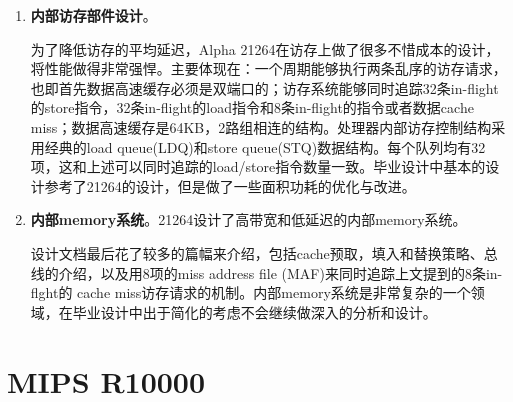 \begin{enumerate}[label=(\alph*)]
	\item \textbf{内部访存部件设计}。
	
	为了降低访存的平均延迟，Alpha 21264在访存上做了很多不惜成本的设计，将性能做得非常强悍。主要体现在：一个周期能够执行两条乱序的访存请求，也即首先数据高速缓存必须是双端口的；访存系统能够同时追踪32条in-flight的store指令，32条in-flight的load指令和8条in-flight的指令或者数据cache miss；数据高速缓存是64KB，2路组相连的结构\citep{Alpha21264}。处理器内部访存控制结构采用经典的load queue(LDQ)和store queue(STQ)数据结构。每个队列均有32项，这和上述可以同时追踪的load/store指令数量一致\citep{Alpha21264}。毕业设计中基本的设计参考了21264的设计，但是做了一些面积功耗的优化与改进。
	\item \textbf{内部memory系统}。21264设计了高带宽和低延迟的内部memory系统。
	
	设计文档\citet{Alpha21264}最后花了较多的篇幅来介绍，包括cache预取，填入和替换策略、总线的介绍，以及用8项的miss address file (MAF)来同时追踪上文提到的8条in-flght的 cache miss访存请求的机制。内部memory系统是非常复杂的一个领域，在毕业设计中出于简化的考虑不会继续做深入的分析和设计。
\end{enumerate}

\section{MIPS R10000}\label{subsec:r10000}

